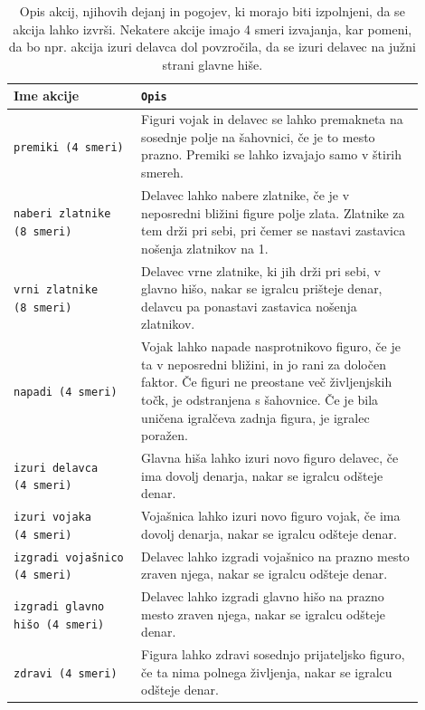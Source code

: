 \documentclass[a4paper, 12pt]{book}
\begin{document}
{\begin{table}
	\begin{center}
		\begin{tabular}{p{0.28\linewidth}|p{0.62\linewidth}}
			Ime akcije                          & {\tt Opis} \\ \hline
			{\tt premiki (4~smeri)}             & Figuri vojak in delavec se lahko premakneta na sosednje polje na šahovnici, če je to mesto prazno.
												  Premiki se lahko izvajajo samo v štirih smereh.\\
			{\tt naberi zlatnike (8~smeri)}     & Delavec lahko nabere zlatnike, če je v neposredni bližini figure polje zlata.
												  Zlatnike za tem drži pri sebi, pri čemer se nastavi zastavica nošenja zlatnikov na 1.\\
			{\tt vrni zlatnike (8~smeri)}       & Delavec vrne zlatnike, ki jih drži pri sebi, v glavno hišo, nakar se igralcu prišteje denar, delavcu pa ponastavi zastavica nošenja zlatnikov.\\
			{\tt napadi (4~smeri)}              & Vojak lahko napade nasprotnikovo figuro, če je ta v neposredni bližini, in jo rani za določen faktor. 
												  Če figuri ne preostane več življenjskih točk, je odstranjena s šahovnice. Če je bila uničena igralčeva zadnja figura, je igralec poražen.\\
			{\tt izuri delavca (4~smeri)}       & Glavna hiša lahko izuri novo figuro delavec, če ima dovolj denarja, nakar se igralcu odšteje denar.\\
			{\tt izuri vojaka (4~smeri)}        & Vojašnica lahko izuri novo figuro vojak, če ima dovolj denarja, nakar se igralcu odšteje denar.\\
			{\tt izgradi vojašnico (4~smeri)}   & Delavec lahko izgradi vojašnico na prazno mesto zraven njega, nakar se igralcu odšteje denar.\\
			{\tt izgradi glavno hišo (4~smeri)} & Delavec lahko izgradi glavno hišo na prazno mesto zraven njega, nakar se igralcu odšteje denar.\\
			{\tt zdravi (4~smeri)}              & Figura lahko zdravi sosednjo prijateljsko figuro, če ta nima polnega življenja, nakar se igralcu odšteje denar.\\
		\end{tabular}
	\end{center}
	\caption{Opis akcij, njihovih dejanj in pogojev, ki morajo biti izpolnjeni, da se akcija lahko izvrši.
		Nekatere akcije imajo 4 smeri izvajanja, kar pomeni, da bo npr. akcija izuri delavca dol povzročila, da se izuri delavec na južni strani glavne hiše.}
	\label{tableActions}
\end{table}

}
\end{document}
